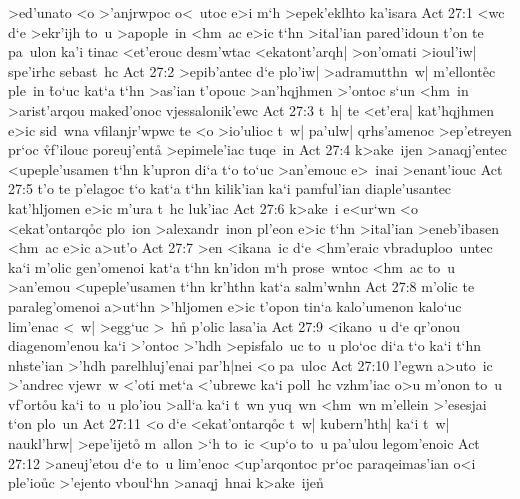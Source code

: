>ed'unato
<o
>'anjrwpoc
o<~utoc
e>i
m`h
>epek'eklhto
ka'isara\bibvsend
\vs Act 27:1
<wc
d`e
>ekr'ijh
to~u
>apople~in
<hm~ac
e>ic
t`hn
>ital'ian
pared'idoun
t'on
te
pa~ulon
ka'i
tinac
<et'erouc
desm'wtac
<ekatont'arqh|
>on'omati
>ioul'iw|
spe'irhc
sebast~hc\bibvsend
\vs Act 27:2
>epib'antec
d`e
plo'iw|
>adramutthn~w|
m'ellont\r{e}c
ple~in
\r{t}o`uc
kat`a
t`hn
>as'ian
t'opouc
>an'hqjhmen
>'ontoc
s`un
<hm~in
>arist'arqou
maked'onoc
vjessalonik'ewc\bibvsend
\vs Act 27:3
t~h|
te
<et'era|
kat'hqjhmen
e>ic
sid~wna
vfilanjr'wpwc
te
<o
>io'ulioc
t~w|
pa'ulw|
qrhs'amenoc
>ep'etreyen
pr`oc
\r{vf}'ilouc
poreuj'ent\r{a}
>epimele'iac
tuqe~in\bibvsend
\vs Act 27:4
k>ake~ijen
>anaqj'entec
<upeple'usamen
t`hn
k'upron
di`a
t`o
to`uc
>an'emouc
e>~inai
>enant'iouc\bibvsend
\vs Act 27:5
t'o
te
p'elagoc
t`o
kat`a
t`hn
kilik'ian
ka`i
pamful'ian
diaple'usantec
kat'hljomen
e>ic
m'ura
t~hc
luk'iac\bibvsend
\vs Act 27:6
k>ake~i
e<ur`wn
<o
<ekat'ontarq\r{o}c
plo~ion
>alexandr~inon
pl'eon
e>ic
t`hn
>ital'ian
>eneb'ibasen
<hm~ac
e>ic
a>ut'o\bibvsend
\vs Act 27:7
>en
<ikana~ic
d`e
<hm'eraic
vbraduploo~untec
ka`i
m'olic
gen'omenoi
kat`a
t`hn
kn'idon
m`h
prose~wntoc
<hm~ac
to~u
>an'emou
<upeple'usamen
t`hn
kr'hthn
kat`a
salm'wnhn\bibvsend
\vs Act 27:8
m'olic
te
paraleg'omenoi
a>ut`hn
>'hljomen
e>ic
t'opon
tin`a
kalo'umenon
kalo`uc
lim'enac
<~w|
>egg`uc
>~hn\r{}
p'olic
lasa'ia\bibvsend
\vs Act 27:9
<ikano~u
d`e
qr'onou
diagenom'enou
ka`i
>'ontoc
>'hdh
>episfalo~uc
to~u
plo`oc
di`a
t`o
ka`i
t`hn
nhste'ian
>'hdh
parelhluj'enai
par'h|nei
<o
pa~uloc\bibvsend
\vs Act 27:10
l'egwn
a>uto~ic
>'andrec
vjewr~w
<'oti
met`a
<'ubrewc
ka`i
poll~hc
vzhm'iac
o>u
m'onon
to~u
vf'ort\r{o}u
ka`i
to~u
plo'iou
>all`a
ka`i
t~wn
yuq~wn
<hm~wn
m'ellein
>'esesjai
t`on
plo~un\bibvsend
\vs Act 27:11
<o
d`e
<ekat'ontarq\r{o}c
t~w|
kubern'hth|
ka`i
t~w|
naukl'hrw|
>epe'ijeto\r{}
m~allon
>`h
to~ic
<up`o
to~u
pa'ulou
legom'enoic\bibvsend
\vs Act 27:12
>aneuj'etou
d`e
to~u
lim'enoc
<up'arqontoc
pr`oc
paraqeimas'ian
o<i
ple'io\r{u}c
>'ejento
vboul`hn
>anaqj~hnai
k>ake~ijen\r{}
